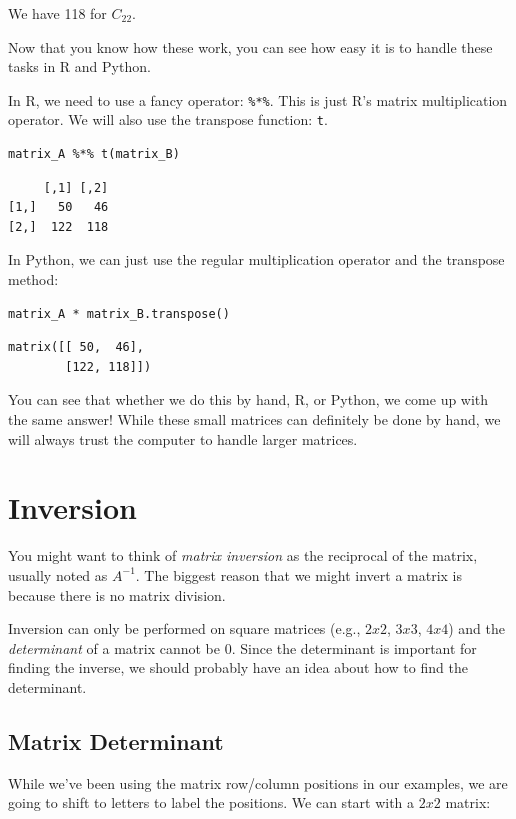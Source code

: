 \documentclass[
  letterpaper,
]{krantz}
\begin{document}
We have 118 for \(C_{22}\).

Now that you know how these work, you can see how easy it is to handle
these tasks in R and Python.

In R, we need to use a fancy operator: \texttt{\%*\%}. This is just R's
matrix multiplication operator. We will also use the transpose function:
\texttt{t}.

\begin{verbatim}
matrix_A %*% t(matrix_B)
\end{verbatim}

\begin{verbatim}
     [,1] [,2]
[1,]   50   46
[2,]  122  118
\end{verbatim}

In Python, we can just use the regular multiplication operator and the
transpose method:

\begin{verbatim}
matrix_A * matrix_B.transpose()
\end{verbatim}

\begin{verbatim}
matrix([[ 50,  46],
        [122, 118]])
\end{verbatim}

You can see that whether we do this by hand, R, or Python, we come up
with the same answer! While these small matrices can definitely be done
by hand, we will always trust the computer to handle larger matrices.

\section{Inversion}\label{inversion}

You might want to think of \emph{matrix inversion} as the reciprocal of
the matrix, usually noted as \(A^{-1}\). The biggest reason that we
might invert a matrix is because there is no matrix division.

Inversion can only be performed on square matrices (e.g., \(2x2\),
\(3x3\), \(4x4\)) and the \emph{determinant} of a matrix cannot be 0.
Since the determinant is important for finding the inverse, we should
probably have an idea about how to find the determinant.

\subsection{Matrix Determinant}\label{matrix-determinant}

While we've been using the matrix row/column positions in our examples,
we are going to shift to letters to label the positions. We can start
with a \(2x2\) matrix:
\end{document}
